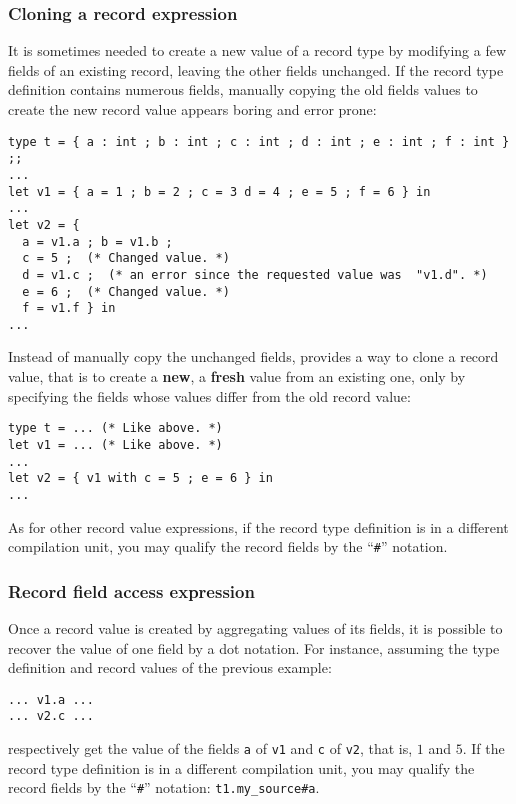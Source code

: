 \subsubsection{Cloning a record expression}
\label{record-clone-expression}
 It is sometimes needed to create a new
value of a record type by modifying a few fields of an existing
record, leaving the other fields unchanged. If the record type
definition contains numerous fields, manually copying the old fields
values to create the new record value appears boring and error prone:
{\scriptsize
\begin{lstlisting}
type t = { a : int ; b : int ; c : int ; d : int ; e : int ; f : int } ;;
...
let v1 = { a = 1 ; b = 2 ; c = 3 d = 4 ; e = 5 ; f = 6 } in
...
let v2 = {
  a = v1.a ; b = v1.b ;
  c = 5 ;  (* Changed value. *)
  d = v1.c ;  (* an error since the requested value was  "v1.d". *)
  e = 6 ;  (* Changed value. *)
  f = v1.f } in
...
\end{lstlisting}
}
Instead of manually copy the unchanged fields, {\focal} provides a way
to clone a record value, that is to create a {\bf new}, a {\bf fresh}
value from an existing one,  only by specifying the fields whose values
differ from the old record value:
{\scriptsize
\begin{lstlisting}
type t = ... (* Like above. *)
let v1 = ... (* Like above. *)
...
let v2 = { v1 with c = 5 ; e = 6 } in
...
\end{lstlisting}
}
As for other record value expressions, if the record type definition
is in a different compilation unit, you may qualify the record fields
by the ``{\tt\#}'' notation.



\subsubsection{Record field access expression}
\label{record-field-access}
Once a record value is created by aggregating values of its fields, it
is possible to recover the value of one field by a dot notation. For
instance, assuming the type definition and record values of the
previous example:
{\scriptsize
\begin{lstlisting}
... v1.a ...
... v2.c ...
\end{lstlisting}
}
respectively get the value of the fields {\tt a} of {\tt v1} and
{\tt c} of {\tt v2}, that is, $1$ and $5$. If the record type
definition is in a different compilation unit, you may qualify the
record fields by the ``{\tt\#}'' notation: {\tt t1.my\_source\#a}.



